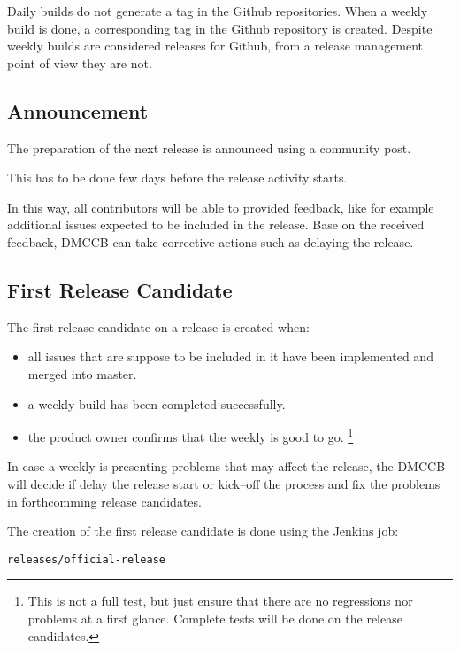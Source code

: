 Daily builds do not generate a tag in the Github repositories.
When a weekly build is done, a corresponding tag in the Github repository is created.
Despite weekly builds are considered releases for Github, from a release management point of view they are not.


\subsection{Announcement} \label{sect:anaouncement}

The preparation of the next release is announced using a community post.

This has to be done few days before the release activity starts.

In this way, all contributors will be able to provided feedback, like for example additional issues expected to be included in the release.
Base on the received feedback, DMCCB can take corrective actions such as delaying the release.


\subsection{First Release Candidate} \label{sect:firstrc}

The first release candidate on a release is created when:

\begin{itemize}
\item all issues that are suppose to be included in it have been implemented and merged into master.
\item a weekly build has been completed successfully.
\item the product owner confirms that the weekly is good to go. \footnote{This is not a full test, but just ensure that there are no regressions nor problems at a first glance. Complete tests will be done on the release candidates.}
\end{itemize}

In case a weekly is presenting problems that may affect the release, the DMCCB will decide if delay the release start or kick--off the process and fix the problems in forthcomming release candidates.

The creation of the first release candidate is done using the Jenkins job:

\begin{verbatim}
releases/official-release
\end{verbatim}

